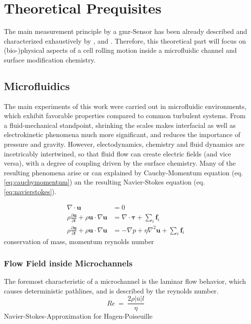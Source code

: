 \chapter{Theoretical Prequisites}
The main measurement principle by a \gls{gmr}-Sensor has been already described and characterized exhaustively by \citet{lit:thes:helou}, \citet{lit:thes:reisbeck} and \citet{lit:thes:brenner}. Therefore, this theoretical part will focus on (bio-)physical aspects of a cell rolling motion inside a microfluidic channel and surface modification chemistry.

\section{Microfluidics}
The main experiments of this work were carried out in microfluidic environments, which exhibit favorable properties compared to common turbulent systems. From a fluid-mechanical standpoint, shrinking the scales makes interfacial as well as electrokinetic phenomena much more significant, and reduces the importance of pressure and gravity.\cite{lit:fluidic:kirby} However, electodynamics, chemistry and fluid dynamics are incetricably intertwined, so that fluid flow can create electric fields (and vice versa), with a degree of coupling driven by the surface chemistry. Many of the resulting phenomena arise or can explained by Cauchy-Momentum equation (eq. \ref{eq:cauchymomentum}) an the resulting Navier-Stokes equation (eq. \ref{eq:navierstokes}).

\begin{align}
	\nabla \cdot \mathbf{u} &= 0 \\
		\rho \frac{\partial \mathbf{u}}{\partial t} + \rho\mathbf{u} \cdot \nabla \mathbf{u} &= \nabla \cdot \boldsymbol{\tau} + \sum_{i}\mathbf{f}_i \label{eq:cauchymomentum} \\	
	\rho \frac{\partial \mathbf{u}}{\partial t} + \rho\mathbf{u} \cdot \nabla \mathbf{u} &= -\nabla p + \eta \nabla^2 \mathbf{u} + \sum_{i}\mathbf{f}_i \label{eq:navierstokes}
\end{align}
conservation of mass, momentum
reynolds number
\subsection{Flow Field inside Microchannels}
The foremost characteristic of a microchannel is the laminar flow behavior, which causes deterministic pathlines, and is described by the reynolds number. 
\begin{equation}
	\mathit{Re}\ =\ \frac{2 \rho |\overline{u}| l }{\eta}
\end{equation}
Navier-Stokes-Approximation for Hagen-Poiseuille

